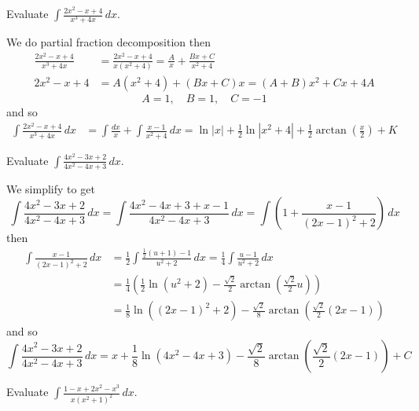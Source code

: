 \begin{problem}
    Evaluate \(\displaystyle{\int\frac{2x^2-x+4}{x^3+4x}\,dx}\).
\end{problem}
\begin{solution}
    We do partial fraction decomposition then
    \begin{align*}
        \frac{2x^2-x+4}{x^3+4x} &= \frac{2x^2-x+4}{x(x^2+4)}
        =\frac{A}{x}+\frac{Bx+C}{x^2+4} \\
        2x^2-x+4 &= A(x^2+4)+(Bx+C)x=(A+B)x^2+Cx+4A
    \end{align*}
    \[A=1, \quad B=1,\quad C=-1\]
    and so
    \begin{align*}
        \int\frac{2x^2-x+4}{x^3+4x}\,dx
        &= \int\frac{dx}{x}+\int\frac{x-1}{x^2+4}\,dx
        =\ln|x|+\frac{1}{2}\ln|x^2+4|
        +\frac{1}{2}\arctan\left(\frac{x}{2}\right)+K
    \end{align*}
\end{solution}
\begin{problem}
    Evaluate \(\displaystyle{\int\frac{4x^2-3x+2}{4x^2-4x+3}\,dx}\).
\end{problem}
\begin{solution}
    We simplify to get
    \[\int\frac{4x^2-3x+2}{4x^2-4x+3}\,dx
    =\int\frac{4x^2-4x+3+x-1}{4x^2-4x+3}\,dx
    =\int\left(1+\frac{x-1}{(2x-1)^2+2}\right)\,dx\]
    then
    \begin{align*}
        \int\frac{x-1}{(2x-1)^2+2}\,dx
        &= \frac{1}{2}\int\frac{\frac{1}{2}(u+1)-1}{u^2+2}\,dx
        =\frac{1}{4}\int\frac{u-1}{u^2+2}\,dx \\
        &= \frac{1}{4}\left(\frac{1}{2}\ln(u^2+2)
        -\frac{\sqrt{2}}{2}\arctan\left(\frac{\sqrt{2}}{2}u\right)\right) \\
        &= \frac{1}{8}\ln((2x-1)^2+2)
        -\frac{\sqrt{2}}{8}\arctan\left(\frac{\sqrt{2}}{2}(2x-1)\right)
    \end{align*}
    and so
    \[\int\frac{4x^2-3x+2}{4x^2-4x+3}\,dx
    =x+\frac{1}{8}\ln(4x^2-4x+3)
    -\frac{\sqrt{2}}{8}\arctan\left(\frac{\sqrt{2}}{2}(2x-1)\right)
    +C\]
\end{solution}
\begin{problem}
    Evaluate \(\displaystyle{\int\frac{1-x+2x^2-x^3}{x(x^2+1)^2}\,dx}\).
\end{problem}
